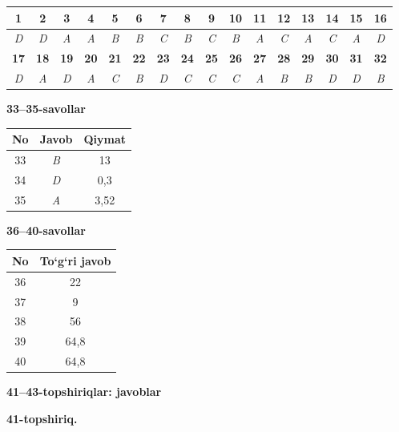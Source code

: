 \documentclass[11pt,a4paper]{article}
\begin{document}
\noindent\begin{tabular}{|c|c|c|c|c|c|c|c|c|c|c|c|c|c|c|c|}\hline
\textbf{1} & \textbf{2} & \textbf{3} & \textbf{4} & \textbf{5} & \textbf{6} & \textbf{7} & \textbf{8} & \textbf{9} & \textbf{10} & \textbf{11} & \textbf{12} & \textbf{13} & \textbf{14} & \textbf{15} & \textbf{16}\\\hline
\textsl{D} & \textsl{D} & \textsl{A} & \textsl{A} & \textsl{B} & \textsl{B} & \textsl{C} & \textsl{B} & \textsl{C} & \textsl{B} & \textsl{A} & \textsl{C} & \textsl{A} & \textsl{C} & \textsl{A} & \textsl{D}\\\hline
\textbf{17} & \textbf{18} & \textbf{19} & \textbf{20} & \textbf{21} & \textbf{22} & \textbf{23} & \textbf{24} & \textbf{25} & \textbf{26} & \textbf{27} & \textbf{28} & \textbf{29} & \textbf{30} & \textbf{31} & \textbf{32}\\\hline
\textsl{D} & \textsl{A} & \textsl{D} & \textsl{A} & \textsl{C} & \textsl{B} & \textsl{D} & \textsl{C} & \textsl{C} & \textsl{C} & \textsl{A} & \textsl{B} & \textsl{B} & \textsl{D} & \textsl{D} & \textsl{B}\\\hline
\end{tabular}\par\medskip
\noindent\textbf{33--35-savollar}\par\smallskip
\noindent\begin{tabular}{|c|c|c|}\hline \textbf{No} & \textbf{Javob} & \textbf{Qiymat}\\\hline
33 & \textsl{B} & 13\\\hline
34 & \textsl{D} & 0,3\\\hline
35 & \textsl{A} & 3,52\\\hline
\end{tabular}\par\medskip
\noindent\textbf{36--40-savollar}\par\smallskip
\noindent\begin{tabular}{|c|c|}\hline \textbf{No} & \textbf{To`g`ri javob}\\\hline
36 & 22\\\hline
37 & 9\\\hline
38 & 56\\\hline
39 & 64,8\\\hline
40 & 64,8\\\hline
\end{tabular}\par\medskip
\noindent\textbf{41--43-topshiriqlar: javoblar}\par\smallskip
\noindent\textbf{41-topshiriq.}\par
\end{document}

